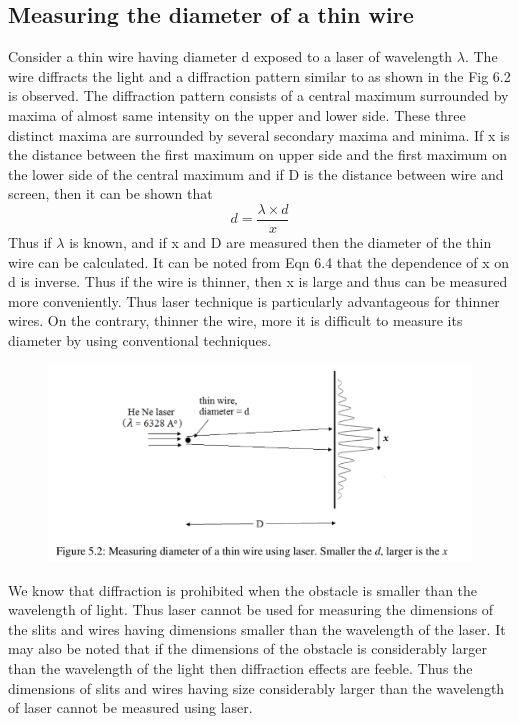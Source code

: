 \documentclass[11pt]{article}
\begin{document}
\subsection{Measuring the diameter of a thin wire}
Consider a thin wire having diameter d exposed to a laser of wavelength $\lambda$. The wire diffracts the
light and a diffraction pattern similar to as shown in the Fig 6.2 is observed. The diffraction
pattern consists of a central maximum surrounded by maxima of almost same intensity on the
upper and lower side. These three distinct maxima are surrounded by several secondary maxima
and minima. If x is the distance between the first maximum on upper side and the first maximum
on the lower side of the central maximum and if D is the distance between wire and screen,
then it can be shown that
\begin{equation}
	d = \frac{\lambda \times d}{x}
\end{equation}
Thus if $\lambda$ is known, and if x and D are measured then the diameter of the thin wire can be
calculated. It can be noted from Eqn 6.4 that the dependence of x on d is inverse. Thus if the
wire is thinner, then x is large and thus can be measured more conveniently. Thus laser technique
is particularly advantageous for thinner wires. On the contrary, thinner the wire, more it is
difficult to measure its diameter by using conventional techniques.
\begin{figure}[H]
	\centering
	\includegraphics[scale=0.4]{3.png}
	\label{it}
\end{figure}

We know that diffraction is prohibited when the obstacle is smaller than the wavelength
of light. Thus laser cannot be used for measuring the dimensions of the slits and wires having
dimensions smaller than the wavelength of the laser. It may also be noted that if the dimensions
of the obstacle is considerably larger than the wavelength of the light then diffraction effects are
feeble. Thus the dimensions of slits and wires having size considerably larger than the
wavelength of laser cannot be measured using laser.\\
\end{document}
